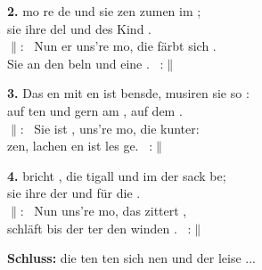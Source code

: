 \textbf{2.} mo  re de und sie zen zumen im ; \\
sie  ihre del und des Kind . \\
$\|$:~ Nun er uns're mo, die  färbt sich . \\
Sie  an den beln und  eine . ~:$\|$

\textbf{3.} Das en mit en ist bensde, musiren  sie so : \\
auf ten und gern am , auf dem . \\
$\|$:~ Sie ist , uns're mo, die  kunter: \\
zen, lachen en ist les ge. ~:$\|$

\textbf{4.}  bricht , die tigall  und im  der sack be; \\
sie  ihre der und  für die . \\
$\|$:~ Nun  uns're mo, das  zittert , \\
 schläft bis der ter den winden . ~:$\|$

\textbf{Schluss:}  die ten ten sich nen und der  leise ...
